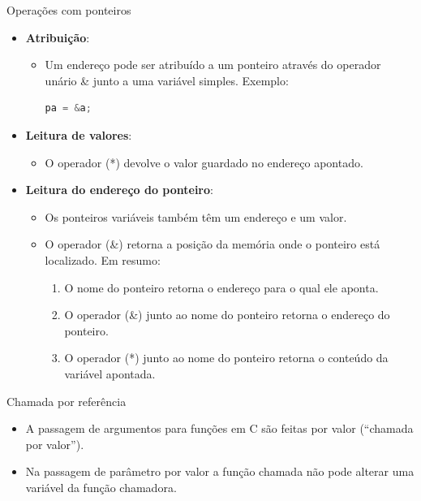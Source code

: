 \begin{frame}[fragile,c]{Operações com ponteiros}
\begin{itemize}[<+->]
  \item \textbf{Atribuição}:
  \begin{itemize}[<+->]
    \item Um endereço pode ser atribuído a um ponteiro através do operador unário \& junto a uma variável simples. Exemplo: 
\begin{lstlisting}[language=C]
  pa = &a;
\end{lstlisting}
  \end{itemize}
  \item \textbf{Leitura de valores}:
  \begin{itemize}[<+->]
    \item O operador (*) devolve o valor guardado no endereço apontado.
  \end{itemize}
  \item \textbf{Leitura do endereço do ponteiro}:
  \begin{itemize}[<+->]
    \item Os ponteiros variáveis também têm um endereço e um valor.
    \item O operador (\&) retorna a posição da memória onde o ponteiro está localizado. Em resumo:        
    \begin{enumerate}[<+->]
      \item O nome do ponteiro retorna o endereço para o qual ele aponta.
      \item O operador (\&) junto ao nome  do ponteiro retorna o endereço do ponteiro.
      \item O operador (*) junto ao nome do ponteiro retorna o conteúdo da variável apontada. 
    \end{enumerate}
  \end{itemize}
\end{itemize}
\end{frame}

\begin{frame}[c]{Chamada por referência}  
  \begin{itemize}
    \item A passagem de argumentos para funções em C são feitas por valor (``chamada por valor'').
    \item Na passagem de parâmetro por valor a função chamada \alert{não pode alterar} uma variável da função chamadora.
  \end{itemize}
\end{frame}

